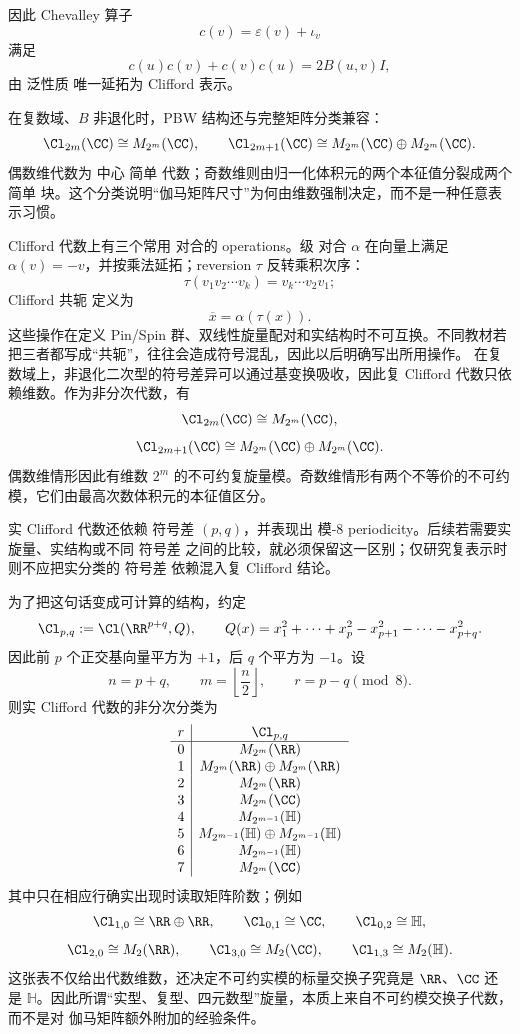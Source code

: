 因此 Chevalley 算子
\begin{equation*}c(v)=\varepsilon(v)+\iota_v\end{equation*}
满足
\[
c(u)c(v)+c(v)c(u)=2B(u,v)I,
\]
由 泛性质 唯一延拓为 Clifford 表示。

在复数域、$B$ 非退化时，PBW 结构还与完整矩阵分类兼容：
\[
\Cl_{2m}(\CC)\cong M_{2^m}(\CC),
\qquad
\Cl_{2m+1}(\CC)
\cong M_{2^m}(\CC)\oplus M_{2^m}(\CC).
\]
偶数维代数为 中心 简单 代数；奇数维则由归一化体积元的两个本征值分裂成两个 简单 块。这个分类说明“伽马矩阵尺寸”为何由维数强制决定，而不是一种任意表示习惯。

Clifford 代数上有三个常用 对合的 operations。级 对合 $\alpha$ 在向量上满足 $\alpha(v)=-v$，并按乘法延拓；reversion $\tau$ 反转乘积次序：
\[
\tau(v_1v_2\cdots v_k)
=v_k\cdots v_2v_1;
\]
Clifford 共轭 定义为
\[
\overline x=\alpha(\tau(x)).
\]
这些操作在定义 Pin/Spin 群、双线性旋量配对和实结构时不可互换。不同教材若把三者都写成“共轭”，往往会造成符号混乱，因此以后明确写出所用操作。
在复数域上，非退化二次型的符号差异可以通过基变换吸收，因此复 Clifford 代数只依赖维数。作为非分次代数，有
\[
\Cl_{2m}(\CC)
\cong M_{2^m}(\CC),
\]
\[
\Cl_{2m+1}(\CC)
\cong M_{2^m}(\CC)\oplus M_{2^m}(\CC).
\]
偶数维情形因此有维数 $2^m$ 的不可约复旋量模。奇数维情形有两个不等价的不可约模，它们由最高次数体积元的本征值区分。

实 Clifford 代数还依赖 符号差 $(p,q)$，并表现出 模-8 periodicity。后续若需要实旋量、实结构或不同 符号差 之间的比较，就必须保留这一区别；仅研究复表示时则不应把实分类的 符号差 依赖混入复 Clifford 结论。

为了把这句话变成可计算的结构，约定
\[
\Cl_{p,q}:=\Cl(\RR^{p+q},Q),
\qquad
Q(x)=x_1^2+\cdots+x_p^2-x_{p+1}^2-\cdots-x_{p+q}^2.
\]
因此前 $p$ 个正交基向量平方为 $+1$，后 $q$ 个平方为 $-1$。设
\[
n=p+q,
\qquad
m=\left\lfloor\frac n2\right\rfloor,
\qquad
r=p-q\pmod 8.
\]
则实 Clifford 代数的非分次分类为
\begin{equation}
\begin{array}{c|c}
r & \Cl_{p,q} \\
\hline
0 & M_{2^m}(\RR)\\
1 & M_{2^m}(\RR)\oplus M_{2^m}(\RR)\\
2 & M_{2^m}(\RR)\\
3 & M_{2^m}(\CC)\\
4 & M_{2^{m-1}}(\mathbb H)\\
5 & M_{2^{m-1}}(\mathbb H)\oplus M_{2^{m-1}}(\mathbb H)\\
6 & M_{2^{m-1}}(\mathbb H)\\
7 & M_{2^m}(\CC)
\end{array}
\label{eq:real-clifford-classification}
\end{equation}
其中只在相应行确实出现时读取矩阵阶数；例如
\[
\Cl_{1,0}\cong\RR\oplus\RR,
\qquad
\Cl_{0,1}\cong\CC,
\qquad
\Cl_{0,2}\cong\mathbb H,
\]
\[
\Cl_{2,0}\cong M_2(\RR),
\qquad
\Cl_{3,0}\cong M_2(\CC),
\qquad
\Cl_{1,3}\cong M_2(\mathbb H).
\]
这张表不仅给出代数维数，还决定不可约实模的标量交换子究竟是 $\RR$、$\CC$ 还是 $\mathbb H$。因此所谓“实型、复型、四元数型”旋量，本质上来自不可约模交换子代数，而不是对 伽马矩阵额外附加的经验条件。

